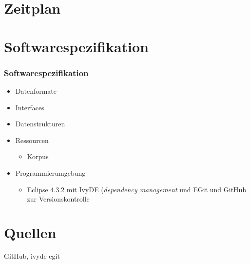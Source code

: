\documentclass[11pt,a4paper]{beamer}
\begin{document}
\section{Zeitplan}

\begin{frame}

    \begin{gantt}{10}{9}
    \begin{ganttitle}
    \end{ganttitle}
    \begin{ganttitle}
    \end{ganttitle}
  \end{gantt}
  
\end{frame}


\section{Softwarespezifikation}

\begin{frame}
\frametitle{Softwarespezifikation}

\begin{itemize}

	\item Datenformate
	\item Interfaces
	\item Datenstrukturen
	\item Ressourcen
	\begin{itemize}
		\item Korpus
	\end{itemize}
	\item Programmierumgebung
	\begin{itemize}
		\item Eclipse 4.3.2 mit IvyDE (\textit{dependency management} und EGit und GitHub zur Versionskontrolle
	\end{itemize}

\end{itemize}

\end{frame}

\section{Quellen}

GitHub, ivyde egit
\end{document}
